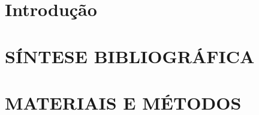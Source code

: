 \documentclass[12pt,oneside,a4paper,chapter=TITLE, english, french,	spanish, brazil]{abntex2-logatti}
\begin{document}


\setcounter{tocdepth}{0}
\tableofcontents
\cleardoublepage



\textual

\chapter*[Introdução]{Introdução}
%

\cleardoublepage
\chapter{SÍNTESE BIBLIOGRÁFICA}

\cleardoublepage
\chapter{MATERIAIS E MÉTODOS}









\postextual
\end{document}
